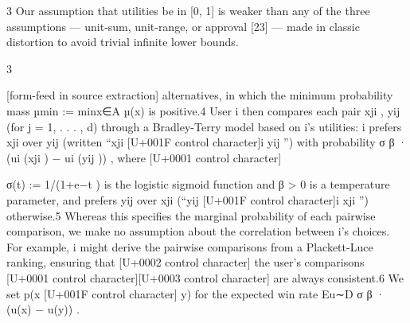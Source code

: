 \documentclass[10pt]{article}
\begin{document}
\begin{ReviewVerbatim}
    3
     Our assumption that utilities be in [0, 1] is weaker than any of the three assumptions — unit-sum, unit-range,
or approval [23] — made in classic distortion to avoid trivial infinite lower bounds.


                                                           3

[form-feed in source extraction]
alternatives, in which the minimum probability mass µmin := minx∈A µ(x) is positive.4 User i
then compares each pair {xji , yij } (for j = 1, . . . , d) through a Bradley-Terry model based on i’s
utilities: i prefers xji over yij (written “xji [U+001F control character]i yij ”) with probability σ β · (ui (xji ) − ui (yij )) , where
                                                                                                        [U+0001 control character]

σ(t) := 1/(1+e−t ) is the logistic sigmoid function and β > 0 is a temperature parameter, and prefers
yij over xji (“yij [U+001F control character]i xji ”) otherwise.5 Whereas this specifies the marginal probability of each pairwise
comparison, we make no assumption about the correlation between i’s choices. For example, i might
derive the pairwise comparisons from a Plackett-Luce ranking, ensuring that      [U+0002 control character] the user’s comparisons  [U+0001 control character][U+0003 control character]
are always consistent.6 We set p(x [U+001F control character] y) for the expected win rate Eu∼D σ β · (u(x) − u(y)) .
\end{ReviewVerbatim}
\end{document}
